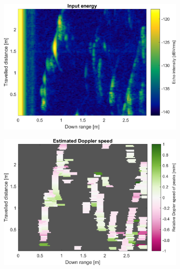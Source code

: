 \begin{figure}[htbp]
    \centering
    \begin{subfigure}[t]{0.475\linewidth}
        \centering
        \includegraphics[width=\linewidth,max height=.475\textheight]{gfx/results/attic_input.png}
    \end{subfigure}%
    \hfill%
    \begin{subfigure}[t]{0.475\linewidth}
        \centering
        \includegraphics[width=\linewidth,max height=.475\textheight]{gfx/results/attic_doppler.png}
    \end{subfigure}\bigskip\\
    \begin{subfigure}[t]{0.5\linewidth}
        \centering

\end{subfigure}
\end{figure}
